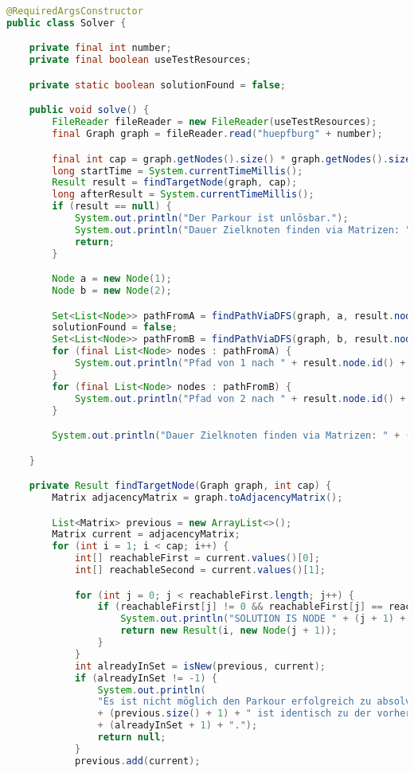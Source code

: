 \begin{lstlisting}[language=Java,label={lst:sourcecode}]
@RequiredArgsConstructor
public class Solver {

    private final int number;
    private final boolean useTestResources;

    private static boolean solutionFound = false;

    public void solve() {
        FileReader fileReader = new FileReader(useTestResources);
        final Graph graph = fileReader.read("huepfburg" + number);

        final int cap = graph.getNodes().size() * graph.getNodes().size();
        long startTime = System.currentTimeMillis();
        Result result = findTargetNode(graph, cap);
        long afterResult = System.currentTimeMillis();
        if (result == null) {
            System.out.println("Der Parkour ist unlösbar.");
            System.out.println("Dauer Zielknoten finden via Matrizen: " + (afterResult - startTime));
            return;
        }

        Node a = new Node(1);
        Node b = new Node(2);

        Set<List<Node>> pathFromA = findPathViaDFS(graph, a, result.node, result.steps);
        solutionFound = false;
        Set<List<Node>> pathFromB = findPathViaDFS(graph, b, result.node, result.steps);
        for (final List<Node> nodes : pathFromA) {
            System.out.println("Pfad von 1 nach " + result.node.id() + ": " + nodes);
        }
        for (final List<Node> nodes : pathFromB) {
            System.out.println("Pfad von 2 nach " + result.node.id() + ": " + nodes);
        }

        System.out.println("Dauer Zielknoten finden via Matrizen: " + (afterResult - startTime));

    }

    private Result findTargetNode(Graph graph, int cap) {
        Matrix adjacencyMatrix = graph.toAdjacencyMatrix();

        List<Matrix> previous = new ArrayList<>();
        Matrix current = adjacencyMatrix;
        for (int i = 1; i < cap; i++) {
            int[] reachableFirst = current.values()[0];
            int[] reachableSecond = current.values()[1];

            for (int j = 0; j < reachableFirst.length; j++) {
                if (reachableFirst[j] != 0 && reachableFirst[j] == reachableSecond[j]) {
                    System.out.println("SOLUTION IS NODE " + (j + 1) + " IN " + i + " STEPS");
                    return new Result(i, new Node(j + 1));
                }
            }
            int alreadyInSet = isNew(previous, current);
            if (alreadyInSet != -1) {
                System.out.println(
                "Es ist nicht möglich den Parkour erfolgreich zu absolvieren, Matrix in Schritt "
                + (previous.size() + 1) + " ist identisch zu der vorherigen Matrix in Schritt "
                + (alreadyInSet + 1) + ".");
                return null;
            }
            previous.add(current);


\end{lstlisting}
